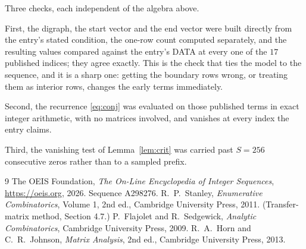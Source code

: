 \documentclass[11pt,a4paper]{article}
\theoremstyle{plain}
\theoremstyle{definition}
\begin{document}
Three checks, each independent of the algebra above.

First, the digraph, the start vector and the end vector were built directly from the
entry's stated condition, the one-row count computed separately, and the resulting values
compared against the entry's DATA at every one of the $17$ published indices; they
agree exactly. This is the check that ties the model to the sequence, and it is a sharp one:
getting the boundary rows wrong, or treating them as interior rows, changes the early terms
immediately.

Second, the recurrence \eqref{eq:conj} was evaluated on those published terms in exact
integer arithmetic, with no matrices involved, and vanishes at every index the entry claims.

Third, the vanishing test of Lemma~\ref{lem:crit} was carried past $S=256$ consecutive
zeros rather than to a sampled prefix.

\begin{thebibliography}{9}
 The OEIS Foundation, \emph{The On-Line Encyclopedia of Integer
Sequences}, \url{https://oeis.org}, 2026. Sequence A298276.
 R.~P.~Stanley, \emph{Enumerative Combinatorics}, Volume 1, 2nd ed.,
Cambridge University Press, 2011. (Transfer-matrix method, Section 4.7.)
 P.~Flajolet and R.~Sedgewick, \emph{Analytic Combinatorics}, Cambridge
University Press, 2009.
 R.~A.~Horn and C.~R.~Johnson, \emph{Matrix Analysis}, 2nd ed., Cambridge
University Press, 2013.
\end{thebibliography}
\end{document}
